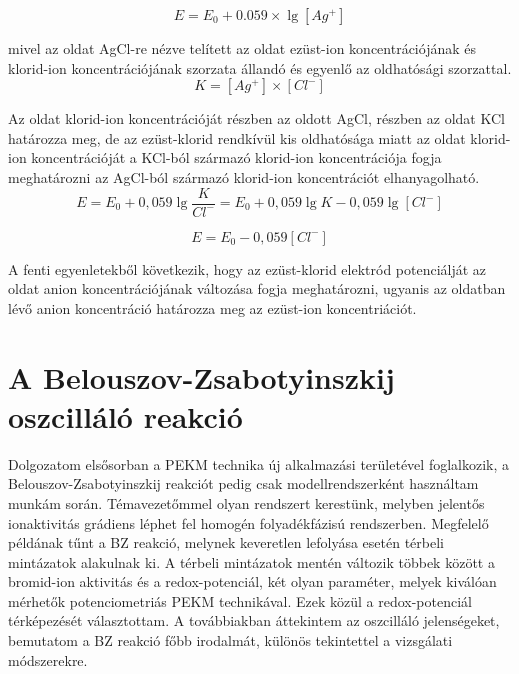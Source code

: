 \begin{enumerate}
\begin{equation}
E = E_0 + 0.059 \times \lg [Ag^+]
\end{equation}

mivel az oldat AgCl-re nézve telített az oldat ezüst-ion koncentrációjának és klorid-ion koncentrációjának szorzata állandó és egyenlő az oldhatósági szorzattal.\\

\begin{equation}
K = [Ag^+] \times [Cl^-]
\end{equation}

Az oldat klorid-ion koncentrációját részben az oldott AgCl, részben az oldat KCl határozza meg, de az ezüst-klorid rendkívül kis oldhatósága miatt az oldat klorid-ion koncentrációját a KCl-ból származó klorid-ion koncentrációja fogja meghatározni az AgCl-ból származó klorid-ion koncentrációt elhanyagolható.\\

\begin{equation}
E = E_\text{0} + 0,059 \lg \frac{K}{Cl^-} = E_\text{0} + 0,059 \lg K - 0,059 \lg [Cl^-]
\end{equation}

\begin{equation}
E = E_\text{0} - 0,059 [Cl^-]
\end{equation}

A fenti egyenletekből következik, hogy az ezüst-klorid elektród potenciálját az oldat anion koncentrációjának változása fogja meghatározni, ugyanis az oldatban lévő anion koncentráció határozza meg az ezüst-ion koncentriációt.
\end{enumerate}
    


\section{A Belouszov-Zsabotyinszkij oszcilláló reakció}
Dolgozatom elsősorban a PEKM technika új alkalmazási területével foglalkozik, a Belouszov-Zsabotyinszkij reakciót pedig csak modellrendszerként használtam munkám során. Témavezetőmmel olyan rendszert kerestünk, melyben jelentős ionaktivitás grádiens léphet fel homogén folyadékfázisú rendszerben. Megfelelő példának tűnt a BZ reakció, melynek keveretlen lefolyása esetén térbeli mintázatok alakulnak ki. A térbeli mintázatok mentén változik többek között a bromid-ion aktivitás és a redox-potenciál, két olyan paraméter, melyek kiválóan mérhetők potenciometriás PEKM technikával. Ezek közül a redox-potenciál térképezését választottam. A továbbiakban áttekintem az oszcilláló jelenségeket, bemutatom a BZ reakció főbb irodalmát, különös tekintettel a vizsgálati módszerekre.

